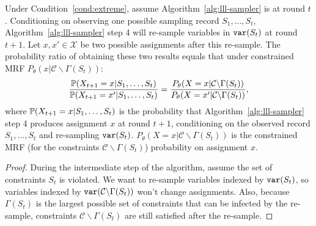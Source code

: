 \begin{lemma} \label{lem:ratio-prob}
    Under Condition~\ref{cond:extreme}, assume Algorithm~\ref{alg:lll-sampler} is at round $t$. Conditioning on observing one possible sampling record $S_1,\ldots,S_t$, Algorithm~\ref{alg:lll-sampler} step 4 will re-sample variables in $\mathtt{var}(S_t)$ at round $t+1$. Let $x,x'\in\mathcal{X}$ be two possible assignments after this re-sample.  The probability ratio  of obtaining these two results equals that under constrained MRF
    $P_{\theta}(x|\mathcal{C}\backslash \Gamma(S_t))$:
    \begin{equation} \label{eq:ratio}
        \frac{\mathbb{P}(X_{t+1}= x |S_1,\ldots, S_t)}{\mathbb{P}(X_{t+1}= x'|S_1,\ldots, S_t)} = \frac{P_{\theta}(X = x |\mathcal{C}\backslash \Gamma(S_t))}{P_{\theta}(X = x'|\mathcal{C}\backslash \Gamma(S_t))},
    \end{equation}
    where $\mathbb{P}(X_{t+1}= x |S_1,\ldots, S_t)$ is the probability that Algorithm~\ref{alg:lll-sampler} step 4 produces assignment $x$ at round $t+1$, conditioning on the observed record $S_1,\ldots, S_t$ and re-sampling $\mathtt{var}(S_t)$. $P_{\theta}(X = x |\mathcal{C}\backslash \Gamma(S_t))$ is the constrained MRF (for the constraints  $\mathcal{C}\backslash \Gamma(S_t)$) probability on assignment $x$.
    \begin{proof}
        During the intermediate step of the algorithm, assume the set of constraints $S_t$ is violated. We want to re-sample variables indexed by $\mathtt{var}(S_t)$, so  variables indexed by $\mathtt{var}(\mathcal{C}\backslash\Gamma(S_t))$ won't change assignments. Also, because $\Gamma(S_t)$ is the largest possible set of constraints that can be infected by the re-sample, constraints $\mathcal{C}\backslash \Gamma(S_t)$ are still satisfied after the re-sample.


\end{proof}
\end{lemma}
